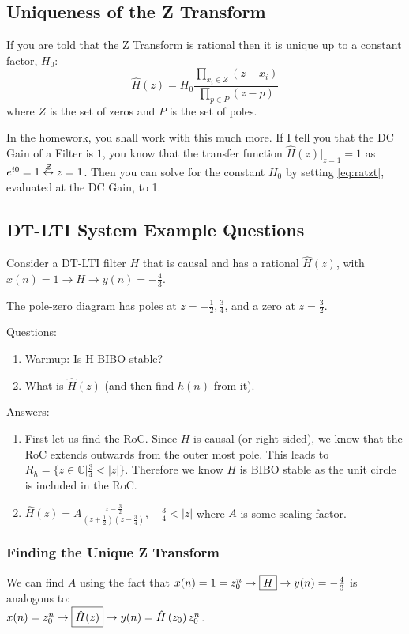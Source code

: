 \subsection{Uniqueness of the Z Transform}
If you are told that the Z Transform is rational then it is unique up to a constant factor, $H_0$:
\begin{equation}\label{eq:ratzt}
    \hat H(z) 
    = H_0 \frac{\displaystyle\prod_{x_i\in Z} (z-x_i)}{\displaystyle\prod_{p\in P} (z-p)}
\end{equation}
where $Z$ is the set of zeros and $P$ is the set of poles. 

In the homework, you shall work with this much more. If I tell you that the DC Gain of a Filter is $1$, you know that the transfer function $\hat H(z)\left.\right|_{z=1}=1$ as $e^{i0}=1\stackrel{\mathcal{Z}}{\leftrightarrow} z=1$. Then you can solve for the constant $H_0$ by setting \eqref{eq:ratzt}, evaluated at the DC Gain, to 1.

\subsection{DT-LTI System Example Questions}
Consider a DT-LTI filter ${H}$ that is causal and has a rational $\hat H(z)$, with\\ 
$x(n)=1 \to \boxed{H} \to y(n)=-\frac{4}{3}$. 

The pole-zero diagram has poles at $z=-\frac{1}{2}, \frac{3}{4}$, and a zero at $z=\frac{3}{2}$. 
\begin{shaded}
Questions:
\begin{enumerate}
    \item Warmup: Is H BIBO stable?
    \item What is $\hat{H}(z)$ (and then find $h(n)$ from it).
\end{enumerate}
\end{shaded}
Answers:
\begin{enumerate}
    \item First let us find the RoC. Since $H$ is causal (or right-sided), we know that the RoC extends outwards from the outer most pole.
    This leads to $R_h=\{z\in\mathbb C\Big|\frac34<|z|\}$.
    Therefore we know $H$ is BIBO stable as the unit circle is included in the RoC.
    \item $\hat{H}(z)=A\frac{z-\frac32}{(z+\frac12)(z-\frac34)},\quad\frac34<|z|$ where $A$ is some scaling factor.
\end{enumerate}

\subsubsection{Finding the Unique Z Transform}
We can find $A$ using the fact that $x(n)=1=z_{0}^{n}\to\boxed{H}\to y(n)=-\frac43$ is analogous to:\\
$x(n)=z_{0}^{n}\to\boxed{\hat{H}(z)}\to y(n)=\hat{H}\left(z_0\right)z_{0}^{n}$.

